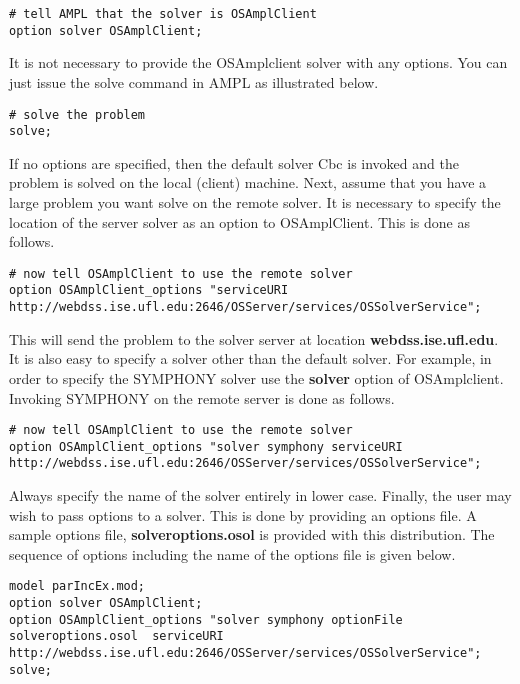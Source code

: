 \documentclass[11pt]{article}
\renewcommand{\{}{{\char"7B}}
\renewcommand{\}}{{\char"7D}}
\renewcommand{\^}{{\char"0D}}
\renewcommand{\'}{{\char"0D}}
\begin{document}
\begin{verbatim}
# tell AMPL that the solver is OSAmplClient
option solver OSAmplClient;
\end{verbatim}

It is not necessary to provide the  OSAmplclient solver with any options. You can just issue the solve command in AMPL as illustrated below.  

\begin{verbatim}
# solve the problem
solve;
\end{verbatim}

If no options are specified, then the default solver Cbc is invoked and the problem is solved on the local (client) machine.  Next, assume that you have a large problem you want solve on the remote solver. It is necessary to specify the location of the server solver as an option to OSAmplClient. This is done as follows.
 
{\tiny 
\begin{verbatim}
# now tell OSAmplClient to use the remote solver
option OSAmplClient_options "serviceURI http://webdss.ise.ufl.edu:2646/OSServer/services/OSSolverService";
\end{verbatim}
}

This will send the problem to the solver server at location {\bf webdss.ise.ufl.edu}.  It is also easy to specify a solver other than the default solver. For example, in order to specify the SYMPHONY solver use the {\bf solver} option of OSAmplclient.   Invoking  SYMPHONY on the remote server is done as follows.


{\tiny 
\begin{verbatim}
# now tell OSAmplClient to use the remote solver
option OSAmplClient_options "solver symphony serviceURI http://webdss.ise.ufl.edu:2646/OSServer/services/OSSolverService";
\end{verbatim}
}
Always specify the name of the solver entirely in lower case.  Finally, the user may wish to pass options to a solver. This is done by providing an options file. A sample options file, {\bf solveroptions.osol} is provided with this distribution.  The sequence of options including the name of the options file is given below.

{\tiny
\begin{verbatim}
model parIncEx.mod;
option solver OSAmplClient;
option OSAmplClient_options "solver symphony optionFile solveroptions.osol  serviceURI http://webdss.ise.ufl.edu:2646/OSServer/services/OSSolverService";
solve;
\end{verbatim}
}
\end{document}
